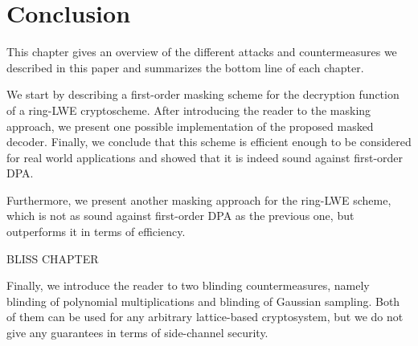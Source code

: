 %
%

\chapter{Conclusion}
This chapter gives an overview of the different attacks and countermeasures we described in this paper and summarizes the bottom line of each chapter.

We start by describing a first-order masking scheme for the decryption function of a \ac{ring-LWE} cryptoscheme. After introducing the reader to the masking approach, we present one possible implementation of the proposed masked decoder. Finally, we conclude that this scheme is efficient enough to be considered for real world applications and showed that it is indeed sound against first-order \ac{DPA}.

Furthermore, we present another masking approach for the \ac{ring-LWE} scheme, which is not as sound against first-order \ac{DPA} as the previous one, but outperforms it in terms of efficiency.

BLISS CHAPTER

Finally, we introduce the reader to two blinding countermeasures, namely blinding of polynomial multiplications and blinding of Gaussian sampling. Both of them can be used for any arbitrary lattice-based cryptosystem, but we do not give any guarantees in terms of side-channel security.


